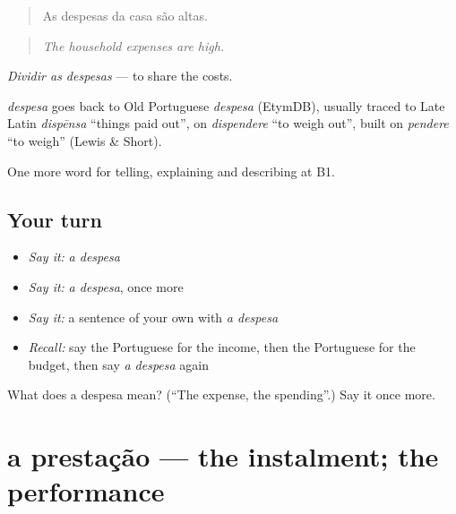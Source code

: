 \begin{quote}
As despesas da casa são altas.
\end{quote}

\begin{quote}
\emph{The household expenses are high.}
\end{quote}

\emph{Dividir as despesas} — to share the costs.

\begin{cousinweb}
\emph{despesa} goes back to Old Portuguese \emph{despesa} (EtymDB), usually traced to Late Latin \emph{dispēnsa} \textquotedblleft{}things paid out\textquotedblright{}, on \emph{dispendere} \textquotedblleft{}to weigh out\textquotedblright{}, built on \emph{pendere} \textquotedblleft{}to weigh\textquotedblright{} (Lewis \& Short).
\end{cousinweb}

\begin{grammarlens}[title={What you've built}]
One more word for telling, explaining and describing at B1.
\end{grammarlens}

\subsection*{Your turn}
\begin{itemize}
\raggedright
  \item \emph{Say it:} \emph{a despesa}
  \item \emph{Say it:} \emph{a despesa}, once more
  \item \emph{Say it:} a sentence of your own with \emph{a despesa}
  \item \emph{Recall:} say the Portuguese for the income, then the Portuguese for the budget, then say \emph{a despesa} again
\end{itemize}

\begin{tcolorbox}[breakable,colback=teal!4,colframe=teal!35!black,title={Before you move on}]
What does a despesa mean? (\textquotedblleft{}The expense, the spending\textquotedblright{}.) Say it once more.
\end{tcolorbox}
\section[a prestação]{a prestação — the instalment; the performance}

\label{lesson:PT-C391-prestacao}



